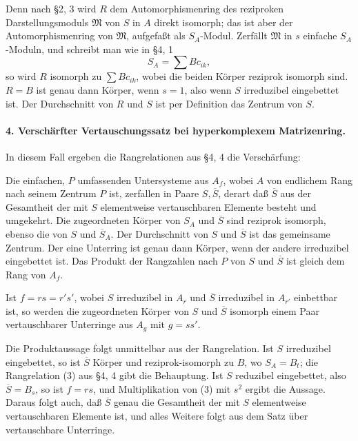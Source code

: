\documentclass[11pt]{article}
\providecommand{\frM}{\mathfrak M}
\begin{document}
Denn nach §2, 3 wird \(R\) dem Automorphismenring des reziproken Darstellungsmoduls \(\frM\) von \(S\) in \(A\) direkt isomorph; das ist aber der Automorphismenring von \(\frM\), aufgefaßt als \(S_A\)-Modul. Zerfällt \(\frM\) in \(s\) einfache \(S_A\)-Moduln, und schreibt man wie in §4, 1
\[
        S_A=\sum Bc_{ik},
\]
so wird \(R\) isomorph zu \(\sum Bc_{ik}\), wobei die beiden Körper reziprok isomorph sind. \(R=B\) ist genau dann Körper, wenn \(s=1\), also wenn \(S\) irreduzibel eingebettet ist. Der Durchschnitt von \(R\) und \(S\) ist per Definition das Zentrum von \(S\).

\paragraph{4. Verschärfter Vertauschungssatz bei hyperkomplexem Matrizenring.}
In diesem Fall ergeben die Rangrelationen aus §4, 4 die Verschärfung:

Die einfachen, \(P\) umfassenden Untersysteme aus \(A_f\), wobei \(A\) von endlichem Rang nach seinem Zentrum \(P\) ist, zerfallen in Paare \(S,\overline S\), derart daß \(\overline S\) aus der Gesamtheit der mit \(S\) elementweise vertauschbaren Elemente besteht und umgekehrt. Die zugeordneten Körper von \(S_A\) und \(\overline S\) sind reziprok isomorph, ebenso die von \(S\) und \(\overline S_A\). Der Durchschnitt von \(S\) und \(\overline S\) ist das gemeinsame Zentrum. Der eine Unterring ist genau dann Körper, wenn der andere irreduzibel eingebettet ist. Das Produkt der Rangzahlen nach \(P\) von \(S\) und \(\overline S\) ist gleich dem Rang von \(A_f\).

Ist \(f=rs=r's'\), wobei \(S\) irreduzibel in \(A_r\) und \(\overline S\) irreduzibel in \(A_{r'}\) einbettbar ist, so werden die zugeordneten Körper von \(S\) und \(\overline S\) isomorph einem Paar vertauschbarer Unterringe aus \(A_g\) mit \(g=ss'\).

Die Produktaussage folgt unmittelbar aus der Rangrelation. Ist \(S\) irreduzibel eingebettet, so ist \(\overline S\) Körper und reziprok-isomorph zu \(B\), wo \(S_A=B_t\); die Rangrelation (3) aus §4, 4 gibt die Behauptung. Ist \(S\) reduzibel eingebettet, also \(\overline S=B_s\), so ist \(f=rs\), und Multiplikation von (3) mit \(s^2\) ergibt die Aussage. Daraus folgt auch, daß \(\overline S\) genau die Gesamtheit der mit \(S\) elementweise vertauschbaren Elemente ist, und alles Weitere folgt aus dem Satz über vertauschbare Unterringe.

\clearpage
\end{document}
